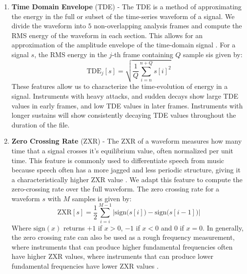 \documentclass[conference,twocolumn,letterpaper]{IEEEtran}
\begin{document}
\begin{enumerate}

\item\textbf{Time Domain Envelope} (TDE) - 
The TDE is a method of approximating the energy in the full or subset of the time-series waveform of a signal. We divide the waveform into $5$ non-overlapping analysis frames and compute the RMS energy of the waveform in each section. This allows for an approximation of the amplitude envelope of the time-domain signal \cite{Virtanen}. For a signal $s$, the RMS energy in the $j$-th frame containing $Q$ sample sis given by:
\begin{equation}
    \label{eqn:TDE}
    \text{TDE}_j[s] = \sqrt{\frac{1}{Q}\sum_{i=n}^{n+Q}s[i]^2}
\end{equation}
These features allow us to characterize the time-evolution of energy in a signal. Instruments with heavy attacks, and sudden decays show large TDE values in early frames, and low TDE values in later frames. Instruments with longer sustains will show consistently decaying TDE values throughout the duration of the file.

\item\textbf{Zero Crossing Rate} (ZXR) - 
The ZXR of a waveform measures how many time that a signal crosses it's equilibrium value, often normalized per unit time. This feature is commonly used to differentiate speech from music because speech often has a more jagged and less periodic structure, giving it a characteristically higher ZXR value \cite{Virtanen,Khan,Zhang}. We adapt this feature to compute the zero-crossing rate over the full waveform. The zero crossing rate for a waveform $s$ with $M$ samples is given by:
\begin{equation}
    \label{eqn:ZXR}
    \text{ZXR}[s] = \frac{1}{2}\sum_{i=i}^{M-1}\Big| \text{sign}\big(s[i]\big) - \text{sign}\big(s[i-1]\big) \Big|
\end{equation}
Where $\text{sign}(x)$  returns $+1$ if $x > 0$, $−1$ if $x < 0$ and $0$ if $x = 0$. In generally, the zero crossing rate can also be used as a rough frequency measurement, where instruments that can produce higher fundamental frequencies often have higher ZXR values, where instruments that can produce lower fundamental frequencies have lower ZXR values \cite{Zhang}.


\end{enumerate}
\end{document}

